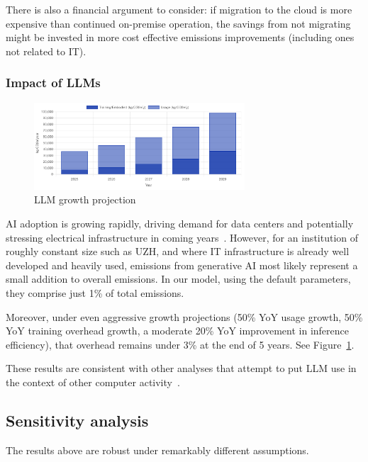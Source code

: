 \documentclass[11pt]{article}
\begin{document}
There is also a financial argument to consider: if migration to the cloud is more expensive than continued on-premise operation, the savings from not migrating might be invested in more cost effective emissions improvements (including ones not related to IT).

\subsubsection*{Impact of LLMs}

\begin{figure}[h]
  \centering
  \includegraphics[width=0.7\textwidth]{fig-llm-growth.png}
  \caption{LLM growth projection}
  \label{fig:llm:growth}
\end{figure}

AI adoption is growing rapidly, driving demand for data centers and potentially stressing electrical infrastructure in coming years~\cite{lbl:dc:2024,iea:ai:energy}. However, for an institution of roughly constant size such as UZH, and where IT infrastructure is already well developed and heavily used, emissions from generative AI most likely represent a small addition to overall emissions. In our model, using the default parameters, they comprise just 1\% of total emissions.

Moreover, under even aggressive growth projections (50\% YoY usage growth, 50\% YoY training overhead growth, a moderate 20\% YoY improvement in inference efficiency), that overhead remains under 3\% at the end of 5 years. See Figure~\ref{fig:llm:growth}.

These results are consistent with other analyses that attempt to put LLM use in the context of other computer activity~\cite{epoch2025howmuchenergydoeschatgptuse,ritchie:chatgpt}.

\subsection{Sensitivity analysis}
\label{sec:sensitivity:analysis}

The results above are robust under remarkably different assumptions.
\end{document}
